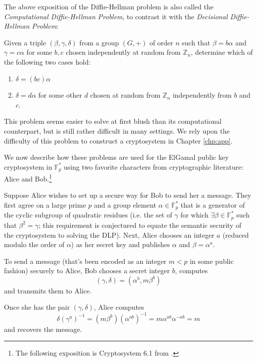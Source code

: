 The above exposition of the Diffie-Hellman problem is also called the
    \textit{Computational Diffie-Hellman Problem}, to contrast it with the
    \textit{Decisional Diffie-Hellman Problem}:
\begin{prob}
Given a triple $(\beta, \gamma, \delta)$ from a group $(G, +)$ of order $n$
    such that $\beta = b \alpha$ and $\gamma = c \alpha$ for some $b, c$ chosen
    independently at random from $\mathbb{Z}_n$, determine which of the
    following two cases hold:
\begin{enumerate}
\item   $\delta = (bc)\alpha$
\item   $\delta = d\alpha$ for some other $d$ chosen at random from
    $\mathbb{Z}_n$ independently from $b$ and $c$.
\end{enumerate}
\end{prob}
This problem seems easier to solve at first blush than its computational
    counterpart, but is still rather difficult in many settings.
We rely upon the difficulty of this problem to construct a cryptosystem in
    Chapter \ref{chp:app}.

We now describe how these problems are used for the ElGamal public key
    cryptosystem in $\mathbb{F}_p^\ast$ using two favorite characters from
    cryptographic literature: Alice and Bob.\footnote{The following exposition
    is Cryptosystem 6.1 from \cite{stinson2005cryptography}.}

\begin{cryp}
Suppose Alice wishes to set up a secure way for Bob to send her a message.
They first agree on a large prime $p$ and a group element $\alpha \in
    \mathbb{F}_p^\ast$ that is a generator of the cyclic subgroup of quadratic
    residues (i.e. the set of $\gamma$ for which $\exists \beta \in
    \mathbb{F}_p^\ast$ such that $\beta^2 = \gamma$; this requirement is
    conjectured to equate the semantic security of the
    cryptosystem to solving the DLP).
Next, Alice chooses an integer $a$ (reduced modulo the order of $\alpha$) as
    her secret key and publishes $\alpha$ and $\beta = \alpha^a$.

To send a message (that's been encoded as an integer $m < p$ in some public
    fashion) securely to Alice, Bob chooses a secret integer $b$, computes
\[
(\gamma, \delta) = (\alpha^b, m\beta^b)
\]
    and transmits them to Alice.

Once she has the pair $(\gamma, \delta)$, Alice computes
\[
\delta(\gamma^a)^{-1}
    =   (m\beta^b)(\alpha^{ab})^{-1}
    =   m\alpha^{ab}\alpha^{-ab}
    =   m
\]
    and recovers the message.
\end{cryp}

